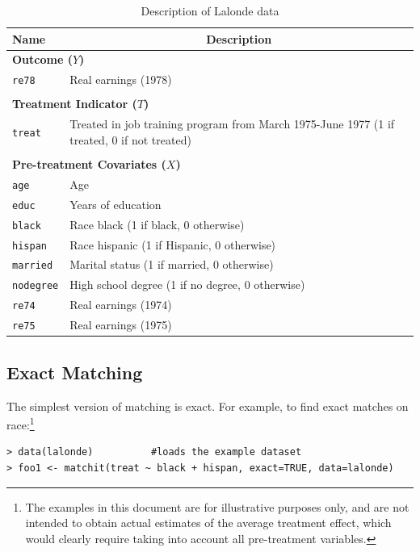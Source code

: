 \documentclass[oneside,letterpaper,titlepage]{article}
\begin{document}
\begin{table}[h]
\label{dwvars}
\centering
\begin{tabular}{lp{3in}}
  \hline 
  \multicolumn{1}{l}{Name} & \multicolumn{1}{c}{Description} \\
  \hline
  \multicolumn{2}{l}{\textbf{Outcome ($Y$)}} \\ 
  \texttt{re78} & Real earnings (1978) \\\\
  \multicolumn{2}{l}{\textbf{Treatment Indicator ($T$)}} \\
  \texttt{treat} & Treated in job training program from March 1975-June
  1977 (1 if treated, 0 if not treated)
  \\ \\
  \multicolumn{2}{l}{\textbf{Pre-treatment Covariates ($X$)}} \\
  \texttt{age} & Age\\
  \texttt{educ} & Years of education \\
  \texttt{black} & Race black (1 if black, 0 otherwise) \\
  \texttt{hispan} & Race hispanic  (1 if Hispanic, 0 otherwise) \\
  \texttt{married} & Marital status (1 if married, 0 otherwise) \\
  \texttt{nodegree} & High school degree (1 if no degree, 0 otherwise)\\
  \texttt{re74} & Real earnings (1974) \\
  \texttt{re75} & Real earnings (1975) \\ 
  \hline
\end{tabular}\label{lalonde}
\caption{Description of Lalonde data}
\end{table}

\subsection{Exact Matching \label{exactm}}
The simplest version of matching is exact.  For example, to find exact
matches on race:\footnote{The examples in this document are for
  illustrative purposes only, and are not intended to obtain actual
  estimates of the average treatment effect, which would clearly
  require taking into account all pre-treatment variables.}

\begin{verbatim}
> data(lalonde)          #loads the example dataset
> foo1 <- matchit(treat ~ black + hispan, exact=TRUE, data=lalonde)
\end{verbatim}
\end{document}
